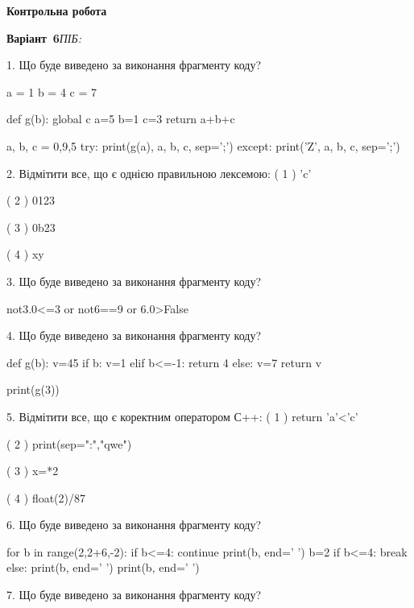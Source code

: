 \documentclass[11pt]{article}
\begin{document}
{\large\textbf{Контрольна робота}}

\textbf{Варіант \No\,6}\hfill \textit{ПІБ:}\,\underline{\hspace{60mm}}
\vspace{4mm}

1. Що буде виведено за виконання фрагменту коду?

a = 1
b = 4
c = 7

def g(b):
global c    a=5
    b=1
    c=3
    return a+b+c

a, b, c = 0,9,5
try:
    print(g(a), a, b, c, sep=';')
except:
    print('Z', a, b, c, sep=';')
\vspace{5mm}

2. %
Відмітити все, що є однією правильною лексемою:
( 1 ) 'c'

( 2 ) 0123

( 3 ) 0b23

( 4 ) xy
\vspace{5mm}

3. Що буде виведено за виконання фрагменту коду?

not3.0<=3 or not6==9 or 6.0>False
\vspace{5mm}

4. Що буде виведено за виконання фрагменту коду?

def g(b):
    v=45
    if b: 
        v=1
    elif b<=-1:
         return 4
    else:
         v=7
    return v

print(g(3))
\vspace{5mm}

5. %
Відмітити все, що є коректним оператором С++:
( 1 ) return 'a'<'c'

( 2 ) print(sep=":","qwe")

( 3 ) x=*2

( 4 ) float(2)/87
\vspace{5mm}

6. Що буде виведено за виконання фрагменту коду?

for b in range(2,2+6,-2):
    if b<=4:
        continue
    print(b, end=' ')
    b=2
    if b<=4:
        break
else:
    print(b, end=' ')
print(b, end=' ')
\vspace{5mm}

7. Що буде виведено за виконання фрагменту коду?
\end{document}
